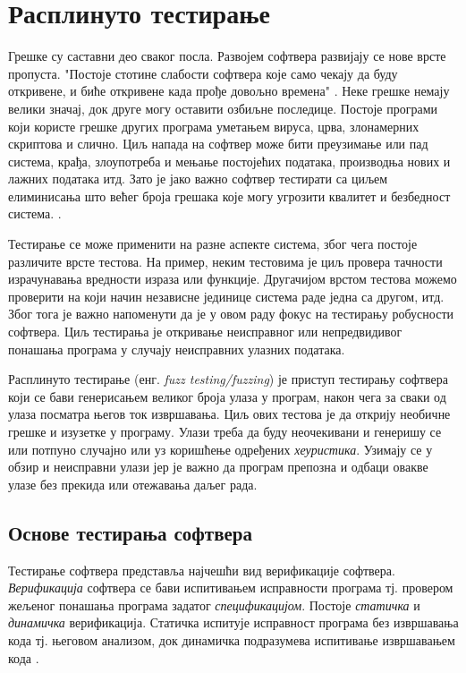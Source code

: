 \documentclass[12pt,oneside]{memoir}
\begin{document}
\chapter{Расплинуто тестирање}
\label{chp:rasplTestiranje}

Грешке су саставни део сваког посла. Развојем софтвера развијају се нове врсте пропуста. "Постоје стотине слабости софтвера које само чекају да буду откривене, и биће откривене када прође довољно времена" \cite{fuzzing}. Неке грешке немају велики значај, док друге могу оставити озбиљне последице. Постоје програми који користе грешке других програма уметањем вируса, црва, злонамерних скриптова и слично. Циљ напада на софтвер може бити преузимање или пад система, крађа, злоупотреба и мењање постојећих података, производња нових и лажних података итд.  Зато је јако важно софтвер тестирати са циљем елиминисања што већег броја грешака које могу угрозити квалитет и безбедност система. \cite{fuzzing, bezbMalkov}.

Тестирање се може применити на разне аспекте система, због чега постоје различите врсте тестова. На пример, неким тестовима је циљ провера тачности израчунавања вредности израза или функције. Другачијом врстом тестова можемо проверити на који начин независне јединице система раде једна са другом, итд. Због тога је важно напоменути да је у овом раду фокус на тестирању робусности софтвера. Циљ тестирања је откривање неисправног или непредвидивог понашања програма у случају неисправних улазних података. 

Расплинуто тестирање (енг. \textit{fuzz testing/fuzzing}) је приступ тестирању софтвера који се бави генерисањем великог броја улаза у програм, након чега за сваки од улаза посматра његов ток извршавања. Циљ ових тестова је да открију необичне грешке и изузетке у програму. Улази треба да буду неочекивани и генеришу се или потпуно случајно или уз коришћење одређених \textit{хеуристика}. Узимају се у обзир и неисправни улази јер је важно да програм препозна и одбаци овакве улазе без прекида или отежавања даљег рада. %

\section{Основе тестирања софтвера}
\label{sec:osnoveTestiranja}

Тестирање софтвера представља најчешћи вид верификације софтвера. \textit{Верификација} софтвера се бави испитивањем исправности програма тј. провером жељеног понашања програма задатог \textit{спецификацијом}. Постоје \textit{статичка} и \textit{динамичка} верификација. Статичка испитује исправност програма без извршавања кода тј. његовом анализом, док динамичка подразумева испитивање извршавањем кода \cite{milenaDokt}. 
\end{document}
